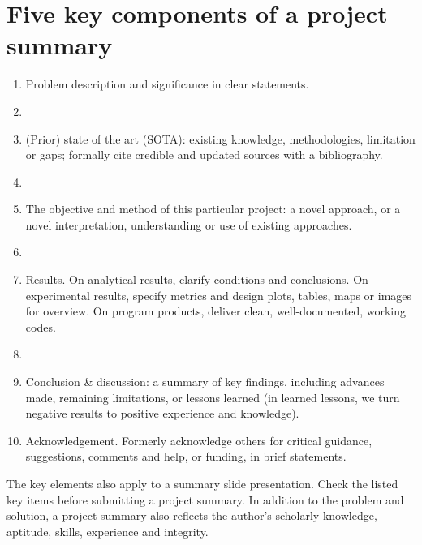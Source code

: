 \documentclass[letterpaper,12pt]{article}
\begin{document}
\section*{Five key components of a project summary}

\vspace{1in}
\begin{enumerate}
\item Problem description and significance in clear statements. 
\item[]
  
\item (Prior) state of the art (SOTA): existing knowledge,
  methodologies, limitation or gaps; formally cite credible and
  updated sources with a bibliography.
\item[]
  
\item The objective and method of this particular project: a novel
  approach, or a novel interpretation, understanding or use of
  existing approaches.
\item[]
  
\item Results. On analytical results, clarify conditions and
  conclusions. On experimental results, specify metrics and design
  plots, tables, maps or images for overview. On program products,
  deliver clean, well-documented, working codes.
\item[]
  
\item Conclusion \& discussion: a summary of key findings, including
  advances made, remaining limitations, or lessons learned (in
  learned lessons, we turn negative results to positive experience and
  knowledge).
\item[ ] Acknowledgement. Formerly acknowledge others for critical
  guidance, suggestions, comments and help, or funding, in brief
  statements.
  
\end{enumerate}

\vspace{3em}

The key elements also apply to a summary slide presentation.  Check
the listed key items before submitting a project summary.  In addition
to the problem and solution, a project summary also reflects the
author's scholarly knowledge, aptitude, skills, experience and
integrity.
\end{document}

